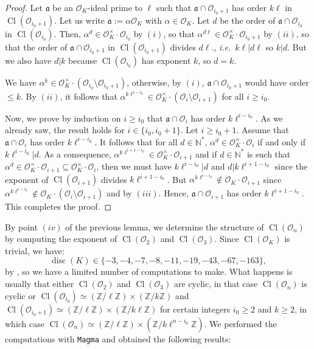 \documentclass[a4paper,10pt,notitlepage]{report}
\theoremstyle{definition}
\theoremstyle{plain}
\theoremstyle{definition}
\newcommand{\ie}{\emph{i.e.}\ }
\newcommand{\N}{\mathbb{N}}
\newcommand{\Z}{\mathbb{Z}}
\newcommand{\mO}{\mathcal{O}}
\renewcommand{\(}{\left(}
\renewcommand{\)}{\right)}
\newcommand{\mf}[1]{\mathfrak{#1}}
\DeclareMathOperator{\disc}{disc}
\DeclareMathOperator{\Cl}{Cl}
\begin{document}
\begin{proof}
Let $\mf{a}$ be an $\mO_K$-ideal prime to $\ell$ such that $\mf{a}\cap\mO_{i_0+1}$ has order $k\ell$ in $\Cl(\mO_{i_0+1})$.  Let us write $\mf{a}:=\alpha\mO_K$ with $\alpha\in\mO_K$. Let $d$ be the order of $\mf{a}\cap\mO_{i_0}$ in $\Cl(\mO_{i_0})$. Then, $\alpha^{d}\in\mO_K^\times\cdot\mO_{i_0}$ by $(i)$, so that $\alpha^{d\ell}\in\mO_K^\times\cdot\mO_{i_0+1}$ by $(ii)$, so that the order of $\mf{a}\cap\mO_{i_0+1}$ in $\Cl(\mO_{i_0+1})$ divides $d\ell$., \ie $k\ell|d\ell$ so $k|d$. But we also have $d|k$ because $\Cl(\mO_{i_0})$ has exponent $k$, so $d=k$. 

We have $\alpha^k\in\mO_K^\times\cdot(\mO_{i_0}\setminus\mO_{i_0+1})$, otherwise, by $(i)$, $\mf{a}\cap\mO_{i_0+1}$ would have order $\leq k$. By $(ii)$, it follows that $\alpha^{k\ell^{i-i_0}}\in\mO_K^\times\cdot(\mO_{i}\setminus\mO_{i+1})$ for all $i\geq i_0$.

Now, we prove by induction on $i\geq i_0$ that $\mf{a}\cap\mO_i$ has order $k\ell^{i-i_0}$. As we already saw, the result holds for $i\in\{i_0,i_0+1\}$. Let $i\geq i_0+1$. Assume that $\mf{a}\cap\mO_i$ has order $k\ell^{i-i_0}$. It follows that for all $d\in\N^*$, $\alpha^d\in\mO_K^\times\cdot \mO_i$ if and only if $k\ell^{i-i_0}|d$.  As a consequence, $\alpha^{k\ell^{i+1-i_0}}\in\mO_K^\times\cdot \mO_{i+1}$ and if $d\in\N^*$ is such that $\alpha^{d}\in\mO_K^\times\cdot \mO_{i+1}\subseteq \mO_K^\times\cdot \mO_{i}$, then we must have $k\ell^{i-i_0}|d$ and $d|k\ell^{i+1-i_0}$ since the exponent of $\Cl(\mO_{i+1})$ divides $k\ell^{i+1-i_0}$. But $\alpha^{k\ell^{i-i_0}}\not\in\mO_K\cdot\mO_{i+1}$ since $\alpha^{k\ell^{i-i_0}}\not\in\mO_K\cdot(\mO_i\setminus\mO_{i+1})$ and by $(iii)$. Hence, $\mf{a}\cap\mO_{i+1}$ has order $k\ell^{i+1-i_0}$. This completes the proof.

\end{proof}

By point $(iv)$ of the previous lemma, we determine the structure of $\Cl(\mO_n)$ by computing the exponent of $\Cl(\mO_2)$ and $\Cl(\mO_3)$. Since $\Cl(\mO_K)$ is trivial, we have:
\[\disc(K)\in\{-3,-4,-7,-8,-11,-19,-43,-67,-163\},\]
by \cite[Theorem 7.30.(i)]{Cox}, so we have a limited number of computations to make. What happens is usually that either $\Cl(\mO_{2})$ and $\Cl(\mO_{3})$ are cyclic, in that case $\Cl(\mO_n)$ is cyclic or $\Cl(\mO_{i_0})\simeq(\Z/\ell\Z)\times(\Z/k\Z)$ and $\Cl(\mO_{i_0+1})\simeq(\Z/\ell\Z)\times(\Z/k\ell\Z)$ for certain integers $i_0\geq 2$ and $k\geq 2$, in which case $\Cl(\mO_n)\simeq(\Z/\ell\Z)\times(\Z/k\ell^{n-i_0}\Z)$.  We performed the computations with \verb?Magma? \cite{Magma} and obtained the following results:
\end{document}
